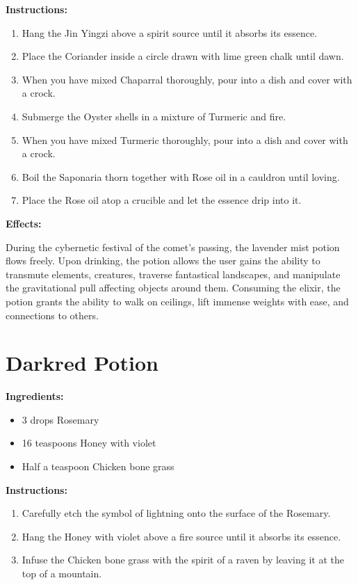 \documentclass{article}
\begin{document}
\textbf{Instructions:}

\begin{enumerate}
  \item Hang the Jin Yingzi above a spirit source until it absorbs its essence.
  \item Place the Coriander inside a circle drawn with lime green chalk until dawn.
  \item When you have mixed Chaparral thoroughly, pour into a dish and cover with a crock.
  \item Submerge the Oyster shells in a mixture of Turmeric and fire.
  \item When you have mixed Turmeric thoroughly, pour into a dish and cover with a crock.
  \item Boil the Saponaria thorn together with Rose oil in a cauldron until loving.
  \item Place the Rose oil atop a crucible and let the essence drip into it.
\end{enumerate}

\textbf{Effects:}

During the cybernetic festival of the comet’s passing, the lavender mist potion flows freely. Upon drinking, the potion allows the user gains the ability to transmute elements, creatures, traverse fantastical landscapes, and manipulate the gravitational pull affecting objects around them. Consuming the elixir, the potion grants the ability to walk on ceilings, lift immense weights with ease, and connections to others.

\newpage
\section*{Darkred Potion}

\textbf{Ingredients:}

\begin{itemize}
  \item 3 drops Rosemary
  \item 16 teaspoons Honey with violet
  \item Half a teaspoon Chicken bone grass
\end{itemize}

\textbf{Instructions:}

\begin{enumerate}
  \item Carefully etch the symbol of lightning onto the surface of the Rosemary.
  \item Hang the Honey with violet above a fire source until it absorbs its essence.
  \item Infuse the Chicken bone grass with the spirit of a raven by leaving it at the top of a mountain.
\end{enumerate}
\end{document}
